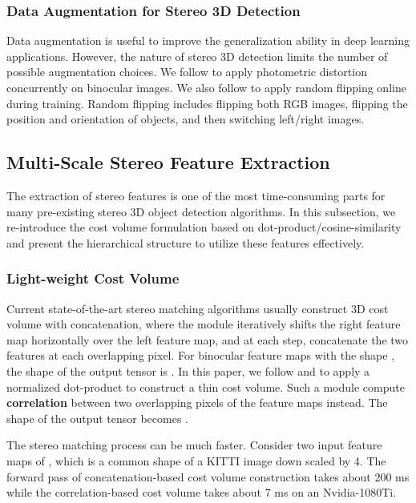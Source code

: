 \documentclass[letterpaper, 10 pt, conference]{ieeeconf}
\begin{document}
\subsubsection{Data Augmentation for Stereo 3D Detection}

Data augmentation is useful to improve the generalization ability in deep learning applications.
However, the nature of stereo 3D detection limits the number of possible augmentation choices.
We follow \cite{Brazil2019M3DRPN} to apply photometric distortion concurrently on binocular images.
We also follow \cite{Li2019Stereo} to apply random flipping online during training. 
Random flipping includes flipping both RGB images, flipping the position and orientation of objects, and then switching left/right images.

\subsection{Multi-Scale Stereo Feature Extraction}
\label{subsec: multiscale_fusion}
The extraction of stereo features is one of the most time-consuming parts for many pre-existing stereo 3D object detection algorithms.
In this subsection, we re-introduce the cost volume formulation based on dot-product/cosine-similarity and present the hierarchical structure to utilize these features effectively.

\subsubsection{Light-weight Cost Volume}
\label{sec.costvolume}
Current state-of-the-art stereo matching algorithms usually construct 3D cost volume with concatenation, where the module iteratively shifts the right feature map horizontally over the left feature map, and at each step, concatenate the two features at each overlapping pixel. For binocular feature maps with the shape , the shape of the output tensor  is . In this paper, we follow \cite{Luo2016EffiStereo} and \cite{wang2020FADNet} to apply a normalized dot-product to construct a thin cost volume. Such a module compute \textbf{correlation} between two overlapping pixels of the feature maps instead. The shape of the output tensor  becomes .

The stereo matching process can be much faster. Consider two input feature maps of , which is a common shape of a KITTI image down scaled by 4. The forward pass of concatenation-based cost volume construction takes about 200 ms while the correlation-based cost volume takes about 7 ms on an Nvidia-1080Ti.
\end{document}
